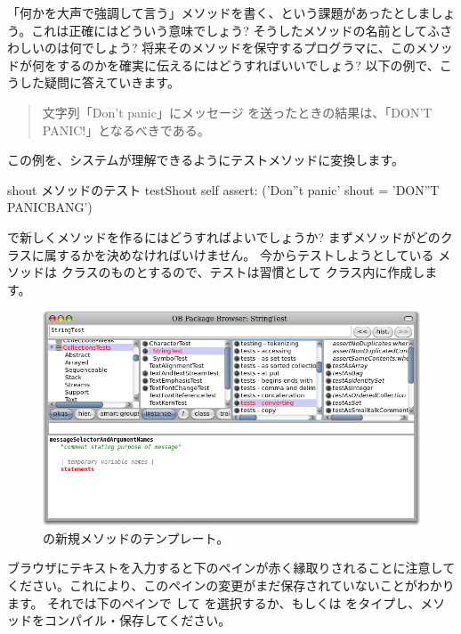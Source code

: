 \documentclass[a4paper,10pt,twoside]{book}
\begin{document}
「何かを大声で強調して言う」メソッドを書く、という課題があったとしましょう。これは正確にはどういう意味でしょう? そうしたメソッドの名前としてふさわしいのは何でしょう? 将来そのメソッドを保守するプログラマに、このメソッドが何をするのかを確実に伝えるにはどうすればいいでしょう? 以下の例で、こうした疑問に答えていきます。

\begin{quote}
文字列「Don't panic」にメッセージ  を送ったときの結果は、「DON'T PANIC!」となるべきである。
\end{quote}

\noindent
この例を、システムが理解できるようにテストメソッドに変換します。

\begin{method}[testShout]{shout メソッドのテスト}
testShout
	self assert: ('Don''t panic' shout = 'DON''T PANICBANG')
\end{method} %

\pharo で新しくメソッドを作るにはどうすればよいでしょうか? まずメソッドがどのクラスに属するかを決めなければいけません。
今からテストしようとしている  メソッドは  クラスのものとするので、テストは習慣として  クラス内に作成します。

\begin{figure}[hbt]
\centerline {\includegraphics[width=\textwidth]{StringTest-newMethodTemplate}}
\caption{ の新規メソッドのテンプレート。
}
\end{figure}

ブラウザにテキストを入力すると下のペインが赤く縁取りされることに注意してください。これにより、このペインの変更がまだ保存されていないことがわかります。
それでは下のペインで \actclick して  を選択するか、もしくは  をタイプし、メソッドをコンパイル・保存してください。
\end{document}
